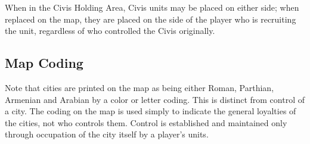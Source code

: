 When in the Civis Holding Area, Civis units may be placed on either side; when replaced on the map, they are placed on the side of the player who is recruiting the unit, regardless of who controlled the Civis originally.

\subsection{Map Coding}

Note that cities are printed on the map as being either Roman, Parthian, Armenian and Arabian by a color or letter coding. This is distinct from control of a city. The coding on the map is used simply to indicate the general loyalties of the cities, not who controls them. Control is established and maintained only through occupation of the city itself by a player's units.
